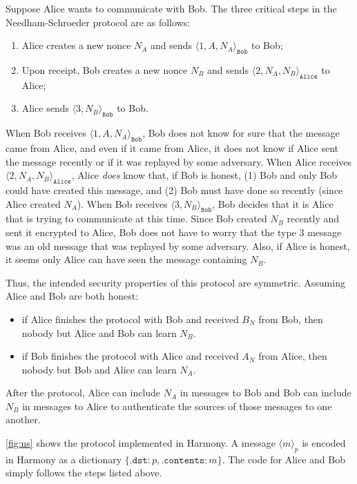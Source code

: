 \documentclass{report}
\begin{document}
Suppose Alice wants to communicate with Bob.  The three critical steps in the
Needham-Schroeder protocol are as follows:

\begin{enumerate}
\item Alice creates a new nonce $N_A$ and sends $\langle 1, A, N_A \rangle_\mathtt{Bob}$
to Bob;
\item Upon receipt, Bob creates a new nonce $N_B$ and sends
$\langle 2, N_A, N_B \rangle_\mathtt{Alice}$ to Alice;
\item Alice sends $\langle 3, N_B \rangle_\mathtt{Bob}$ to Bob.
\end{enumerate}

When Bob receives $\langle 1, A, N_A \rangle_\mathtt{Bob}$, Bob does not know for sure
that the message came from Alice, and even if it came from Alice, it does not know if
Alice sent the message recently or if it was replayed by some adversary.
When Alice receives $\langle 2, N_A, N_B \rangle_\mathtt{Alice}$, Alice \emph{does}
know that, if Bob is honest, (1) Bob and only Bob could have created this message, and
(2) Bob must have done so recently (since Alice created $N_A$).
When Bob receives $\langle 3, N_B \rangle_\mathtt{Bob}$, Bob decides that it is Alice
that is trying to communicate at this time.  Since Bob created $N_B$ recently and sent it
encrypted to Alice, Bob does not have to worry that the type 3 message was an old message
that was replayed by some adversary.
Also, if Alice is honest, it seems only Alice can have seen the message containing $N_B$.

Thus, the intended security properties of this protocol are symmetric.
Assuming Alice and Bob are both honest:
\begin{itemize}
\item if Alice finishes the protocol with Bob and received $B_N$ from Bob, then
nobody but Alice and Bob can learn $N_B$.
\item if Bob finishes the protocol with Alice and received $A_N$ from Alice, then
nobody but Bob and Alice can learn $N_A$.
\end{itemize}

After the protocol, Alice can include $N_A$ in messages to Bob and Bob can
include $N_B$ in messages to Alice to authenticate the sources of those messages
to one another.

\autoref{fig:ns} shows the protocol implemented in Harmony.
A message $\langle m \rangle_p$ is encoded in Harmony as a dictionary
$\{ \mathtt{.dst}: p, \mathtt{.contents}: m \}$.  The code for Alice and Bob
simply follows the steps listed above.
\end{document}
